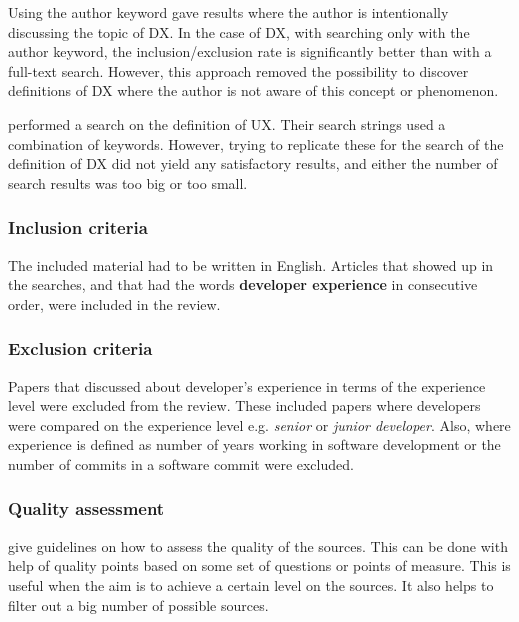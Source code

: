 \documentclass[english, 12pt, a4paper, sci, utf8, a-1b, online]{aaltothesis}
\begin{document}
Using the author keyword gave results where the author is intentionally discussing the topic of DX. In the case of DX, with searching only with the author keyword, the inclusion/exclusion rate is significantly better than with a full-text search. However, this approach removed the possibility to discover definitions of DX where the author is not aware of this concept or phenomenon.

\cite{understanding-ux} performed a search on the definition of UX. Their search strings used a combination of keywords. However, trying to replicate these for the search of the definition of DX did not yield any satisfactory results, and either the number of search results was too big or too small. 

\subsubsection{Inclusion criteria}

The included material had to be written in English. Articles that showed up in the searches, and that had the words \textbf{developer experience} in consecutive order, were included in the review.

\subsubsection{Exclusion criteria}

Papers that discussed about developer's experience in terms of the experience level were excluded from the review. These included papers where developers were compared on the experience level e.g. \textit{senior} or \textit{junior developer}. Also, where experience is defined as number of years working in software development or the number of commits in a software commit were excluded.


\subsubsection{Quality assessment}

\cite{guidelines-for-MLR} give guidelines on how to assess the quality of the sources. This can be done with help of quality points based on some set of questions or points of measure. This is useful when the aim is to achieve a certain level on the sources. It also helps to filter out a big number of possible sources.
\end{document}
